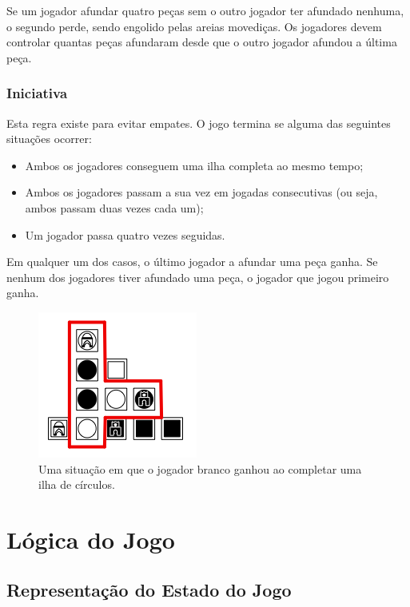 \documentclass[a4paper]{article}
\begin{document}
Se um jogador afundar quatro peças sem o outro jogador ter afundado nenhuma, o segundo perde, sendo engolido pelas areias movediças.
Os jogadores devem controlar quantas peças afundaram desde que o outro jogador afundou a última peça.

\subsubsection{Iniciativa}

Esta regra existe para evitar empates. O jogo termina se alguma das seguintes situações ocorrer:

\begin{itemize}
\item Ambos os jogadores conseguem uma ilha completa ao mesmo tempo;
\item Ambos os jogadores passam a sua vez em jogadas consecutivas (ou seja, ambos passam duas vezes cada um);
\item Um jogador passa quatro vezes seguidas.
\end{itemize}

Em qualquer um dos casos, o último jogador a afundar uma peça ganha. Se nenhum dos jogadores tiver afundado uma peça, o jogador que jogou primeiro ganha.

\begin{figure}[h]
\centering
\includegraphics[scale=0.9]{win.png}
\caption{Uma situação em que o jogador branco ganhou ao completar uma ilha de círculos.}
\label{fig:win}
\end{figure}


\section{Lógica do Jogo}

\subsection{Representação do Estado do Jogo}
\label{gamestate}
\end{document}
